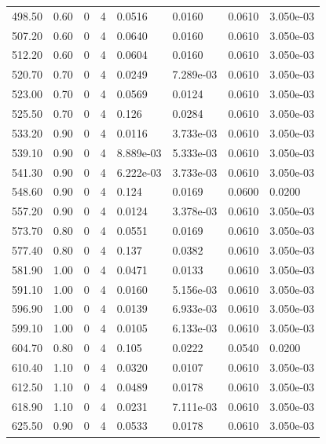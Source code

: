 \documentclass[preview]{standalone}
\begin{document}
{{{{{\begin{tabular}{L{1.2cm}C{1.2cm} C{0.3cm}C{0.5cm} C{1.4cm}C{1.4cm} C{1.4cm}C{1.4cm}}
  498.50  &  0.60  & 0     &  4 &  0.0516  & 0.0160  & 0.0610 &  3.050e-03   \\ 
  507.20  &  0.60  & 0     &  4 &  0.0640  & 0.0160  & 0.0610 &  3.050e-03   \\ 
  512.20  &  0.60  & 0     &  4 &  0.0604  & 0.0160  & 0.0610 &  3.050e-03   \\ 
  520.70  &  0.70  & 0     &  4 &  0.0249  & 7.289e-03  & 0.0610 &  3.050e-03   \\ 
  523.00  &  0.70  & 0     &  4 &  0.0569  & 0.0124  & 0.0610 &  3.050e-03   \\ 
  525.50  &  0.70  & 0     &  4 &  0.126  & 0.0284  & 0.0610 &  3.050e-03   \\ 
  533.20  &  0.90  & 0     &  4 &  0.0116  & 3.733e-03  & 0.0610 &  3.050e-03   \\ 
  539.10  &  0.90  & 0     &  4 &  8.889e-03  & 5.333e-03  & 0.0610 &  3.050e-03   \\ 
  541.30  &  0.90  & 0     &  4 &  6.222e-03  & 3.733e-03  & 0.0610 &  3.050e-03   \\ 
  548.60  &  0.90  & 0     &  4 &  0.124  & 0.0169  & 0.0600 &  0.0200   \\ 
  557.20  &  0.90  & 0     &  4 &  0.0124  & 3.378e-03  & 0.0610 &  3.050e-03   \\ 
  573.70  &  0.80  & 0     &  4 &  0.0551  & 0.0169  & 0.0610 &  3.050e-03   \\ 
  577.40  &  0.80  & 0     &  4 &  0.137  & 0.0382  & 0.0610 &  3.050e-03   \\ 
  581.90  &  1.00  & 0     &  4 &  0.0471  & 0.0133  & 0.0610 &  3.050e-03   \\ 
  591.10  &  1.00  & 0     &  4 &  0.0160  & 5.156e-03  & 0.0610 &  3.050e-03   \\ 
  596.90  &  1.00  & 0     &  4 &  0.0139  & 6.933e-03  & 0.0610 &  3.050e-03   \\ 
  599.10  &  1.00  & 0     &  4 &  0.0105  & 6.133e-03  & 0.0610 &  3.050e-03   \\ 
  604.70  &  0.80  & 0     &  4 &  0.105  & 0.0222  & 0.0540 &  0.0200   \\ 
  610.40  &  1.10  & 0     &  4 &  0.0320  & 0.0107  & 0.0610 &  3.050e-03   \\ 
  612.50  &  1.10  & 0     &  4 &  0.0489  & 0.0178  & 0.0610 &  3.050e-03   \\ 
  618.90  &  1.10  & 0     &  4 &  0.0231  & 7.111e-03  & 0.0610 &  3.050e-03   \\ 
  625.50  &  0.90  & 0     &  4 &  0.0533  & 0.0178  & 0.0610 &  3.050e-03   \\ 

\end{tabular}}}}}}
\end{document}
